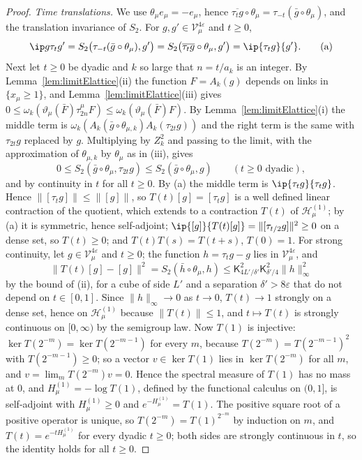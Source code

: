 \begin{proof}
\emph{Time translations.} We use $\theta_\mu e_\mu=-e_\mu$, hence
$\overline{\tau_tg}\circ\theta_\mu=\tau_{-t}(\bar g\circ\theta_\mu)$, and the
translation invariance of $S_2$. For $g,g'\in\mathcal V^{4\varepsilon}_\mu$
and $t\ge0$,
\[
\ip g{\tau_tg'}=S_2\bigl(\tau_{-t}(\bar g\circ\theta_\mu),g'\bigr)=
S_2\bigl(\overline{\tau_tg}\circ\theta_\mu,g'\bigr)=\ip{\tau_tg}{g'} .
\tag{a}
\]
Next let $t\ge0$ be dyadic and $k$ so large that $n=t/a_k$ is an integer.
By Lemma~\ref{lem:limitElattice}(ii) the function $F=A_k(g)$ depends on
links in $\{x_\mu\ge1\}$, and Lemma~\ref{lem:limitElattice}(iii) gives
$0\le\omega_k(\vartheta_\mu(\bar F)\tau^\mu_{2n}F)\le\omega_k(\vartheta_\mu(
\bar F)F)$. By Lemma~\ref{lem:limitElattice}(i) the middle term is
$\omega_k(A_k(\bar g\circ\theta_{\mu,k})A_k(\tau_{2t}g))$ and the right term
is the same with $\tau_{2t}g$ replaced by $g$. Multiplying by $Z_k^2$ and
passing to the limit, with the approximation of $\theta_{\mu,k}$ by
$\theta_\mu$ as in (iii), gives
\[
0\le S_2(\bar g\circ\theta_\mu,\tau_{2t}g)\le S_2(\bar g\circ\theta_\mu,g)
\qquad(t\ge0\text{ dyadic}),
\]
and by continuity in $t$ for all $t\ge0$. By (a) the middle term is
$\ip{\tau_tg}{\tau_tg}$. Hence $\|[\tau_tg]\|\le\|[g]\|$, so $T(t)[g]=
[\tau_tg]$ is a well defined linear contraction of the quotient, which
extends to a contraction $T(t)$ of $\mathcal H^{(1)}_\mu$; by (a) it is
symmetric, hence self-adjoint; $\ip{[g]}{T(t)[g]}=\|[\tau_{t/2}g]\|^2\ge0$
on a dense set, so $T(t)\ge0$; and $T(t)T(s)=T(t+s)$, $T(0)=1$. For strong
continuity, let $g\in\mathcal V^{4\varepsilon}_\mu$ and $t\ge0$; the
function $h=\tau_tg-g$ lies in $\mathcal V^{4\varepsilon}_\mu$, and
\[
\|T(t)[g]-[g]\|^2=S_2(\bar h\circ\theta_\mu,h)\le\mathsf K_{4L'/\delta'}^2
\mathsf K_{\delta'/4}^2\|h\|_\infty^2
\]
by the bound of (ii), for a cube of side $L'$ and a separation $\delta'>8
\varepsilon$ that do not depend on $t\in[0,1]$. Since $\|h\|_\infty\to0$ as
$t\to0$, $T(t)\to1$ strongly on a dense set, hence on $\mathcal H^{(1)}_\mu$
because $\|T(t)\|\le1$, and $t\mapsto T(t)$ is strongly continuous on
$[0,\infty)$ by the semigroup law. Now $T(1)$ is injective: $\ker T(2^{-m})=
\ker T(2^{-m-1})$ for every $m$, because $T(2^{-m})=T(2^{-m-1})^2$ with
$T(2^{-m-1})\ge0$; so a vector $v\in\ker T(1)$ lies in $\ker T(2^{-m})$ for
all $m$, and $v=\lim_mT(2^{-m})v=0$. Hence the spectral measure of $T(1)$
has no mass at $0$, and $H^{(1)}_\mu=-\log T(1)$, defined by the functional
calculus on $(0,1]$, is self-adjoint with $H^{(1)}_\mu\ge0$ and $e^{-H^{(1)}
_\mu}=T(1)$. The positive square root of a positive operator is unique, so
$T(2^{-m})=T(1)^{2^{-m}}$ by induction on $m$, and $T(t)=e^{-tH^{(1)}_\mu}$
for every dyadic $t\ge0$; both sides are strongly continuous in $t$, so the
identity holds for all $t\ge0$.


\end{proof}
